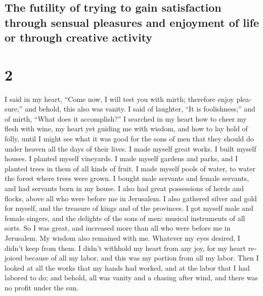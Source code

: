 \begin{paracol}{2}
\switchcolumn
\begin{otherlanguage}{english}

\hypertarget{the-futility-of-trying-to-gain-satisfaction-through-sensual-pleasures-and-enjoyment-of-life-or-through-creative-activity}{%
\subsection{The futility of trying to gain satisfaction through sensual
pleasures and enjoyment of life or through creative
activity}\label{the-futility-of-trying-to-gain-satisfaction-through-sensual-pleasures-and-enjoyment-of-life-or-through-creative-activity}}

\hypertarget{section-3}{%
\section{2}\label{section-3}}

 I said in my heart, ``Come now, I will test you with
mirth; therefore enjoy pleasure;'' and behold, this also was vanity.
 I said of laughter, ``It is foolishness;'' and of mirth,
``What does it accomplish?''  I searched in my heart how
to cheer my flesh with wine, my heart yet guiding me with wisdom, and
how to lay hold of folly, until I might see what it was good for the
sons of men that they should do under heaven all the days of their
lives.  I made myself great works. I built myself houses.
I planted myself vineyards.  I made myself gardens and
parks, and I planted trees in them of all kinds of fruit. 
I made myself pools of water, to water the forest where trees were
grown.  I bought male servants and female servants, and
had servants born in my house. I also had great possessions of herds and
flocks, above all who were before me in Jerusalem.  I also
gathered silver and gold for myself, and the treasure of kings and of
the provinces. I got myself male and female singers, and the delights of
the sons of men: musical instruments of all sorts.  So I
was great, and increased more than all who were before me in Jerusalem.
My wisdom also remained with me.  Whatever my eyes
desired, I didn't keep from them. I didn't withhold my heart from any
joy, for my heart rejoiced because of all my labor, and this was my
portion from all my labor.  Then I looked at all the
works that my hands had worked, and at the labor that I had labored to
do; and behold, all was vanity and a chasing after wind, and there was
no profit under the sun.


\end{otherlanguage}
\end{paracol}
